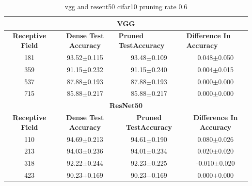 \begin{table}[]
\begin{tabular}{@{}cccc@{}}
\toprule
\multicolumn{4}{c}{\textbf{VGG}}                                                                                                                                  \\ \midrule
\textbf{Receptive Field} & \textbf{Dense Test Accuracy} & \multicolumn{1}{l}{\textbf{Pruned  TestAccuracy}} & \multicolumn{1}{l}{\textbf{Difference In Accuracy}} \\ \midrule
181                      & 93.52$\pm$0.115              & 93.48$\pm$0.109                                   & 0.048$\pm$0.050                                     \\
359                      & 91.15$\pm$0.232              & 91.15$\pm$0.240                                   & 0.004$\pm$0.015                                     \\
537                      & 87.88$\pm$0.193              & 87.88$\pm$0.193                                   & 0.000$\pm$0.000                                     \\
715                      & 85.88$\pm$0.217              & 85.88$\pm$0.217                                   & 0.000$\pm$0.000                                     \\ \midrule
\multicolumn{4}{c}{\textbf{ResNet50}}                                                                                                                             \\ \midrule
\textbf{Receptive Field} & \textbf{Dense Test Accuracy} & \textbf{Pruned  TestAccuracy}                     & \textbf{Difference In Accuracy}                     \\
110                      & 94.69$\pm$0.213              & 94.61$\pm$0.190                                   & 0.080$\pm$0.026                                     \\
213                      & 94.03$\pm$0.236              & 94.01$\pm$0.234                                   & 0.020$\pm$0.020                                     \\
318                      & 92.22$\pm$0.244              & 92.23$\pm$0.225                                   & -0.010$\pm$0.020                                    \\
423                      & 90.23$\pm$0.169              & 90.23$\pm$0.169                                   & 0.000$\pm$0.000                                     \\ \bottomrule
\end{tabular}
\caption{vgg and resent50 cifar10 pruning rate 0.6}
\label{tab:cifar10 pruning rate06}
\end{table}





